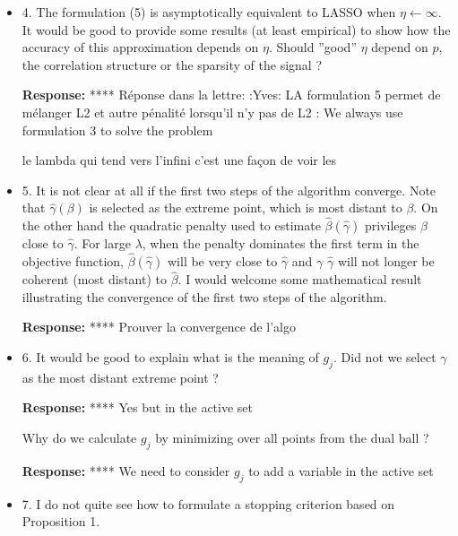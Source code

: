 \documentclass[a4paper,11pt]{texMemo}
\newenvironment{comment}
{
   \par\medskip \color{black}%
   \textbf{Response: }}
{\medskip}
\newenvironment{remark}
{\begin{itshape} \color{gray}}
{\end{itshape}}
\begin{document}
\begin{itemize}
\item
  \begin{remark}
    4. The formulation (5) is asymptotically equivalent to LASSO when
    $\eta \leftarrow \infty$.  It would be good to provide some results (at least
    empirical) to show how the accuracy of this approximation depends
    on  $\eta$.  Should ''good'' $\eta$ depend on $p$, the correlation structure or
    the sparsity of the signal ?
  \end{remark}
  \begin{comment}
****  Réponse dans la lettre:  :Yves:
LA formulation 5 permet de mélanger L2 et autre pénalité lorsqu'il n'y pas de L2 : 
We always use formulation 3 to solve the problem


le lambda qui tend vers l'infini c'est une façon de voir les
\end{comment}

\item 
  \begin{remark}
    5. It is not clear at all if the first two steps of the algorithm
    converge.  Note that $\hat{\gamma}(\beta)$ %
    is selected as the extreme point, which is most distant to
    $\beta$.  On the other hand the quadratic penalty used to estimate
    $\hat{\beta}(\hat{\gamma})$ %
    privileges $\beta$ close to $\hat{\gamma}$.  For large $\lambda$,
    when the penalty dominates the first term in the objective
    function, $\hat{\beta}(\hat{\gamma})$ will be very close to
    $\hat{\gamma}$ and $\gamma$ $\hat{\gamma}$ will not longer be
    coherent (most distant) to $\hat{\beta}$.  I would welcome some
    mathematical result illustrating the convergence of the first two
    steps of the algorithm.
  \end{remark}

  \begin{comment}
    **** Prouver la convergence de l'algo
  \end{comment}
\item 
  \begin{remark}
   6. It would be good to explain what is the meaning of $g_j$. 
   Did not we select $\gamma$ as the most distant extreme point ?
\end{remark}

\begin{comment}
**** Yes but  in the active set
\end{comment}


\begin{remark}
Why do we calculate $g_j$ by minimizing over all points from the dual ball ?
\end{remark}
\begin{comment}
**** We need to consider $g_j$  to add a variable in the active set
\end{comment}
\item
  \begin{remark}
  7. I do not quite see how to formulate a stopping criterion based on Proposition 1.
\end{remark}


\end{itemize}
\end{document}
